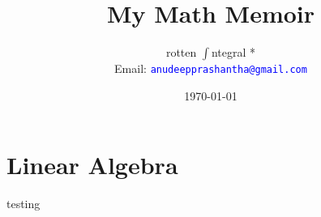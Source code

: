 \documentclass[a4paper, 11pt, openany]{book}
\title{\textbf{My Math Memoir}}
\author{rotten $\int$ntegral *\\Email: \textcolor{blue}{\texttt{anudeepprashantha@gmail.com}}}
\date{\today}
\begin{document}
\maketitle
    \tableofcontents
	

	
	
	
	
	
	
	

	


	
	
	
	
	


	\chapter{Linear Algebra}
	
	
	testing
	
	
	
\end{document}
